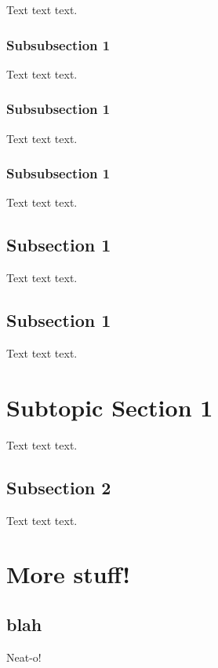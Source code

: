 \documentclass[twoside, titlepage]{amsart}
\theoremstyle{plain} %
\theoremstyle{definition}
\theoremstyle{remark}
\theoremstyle{notation}
\begin{document}
	Text text text.
	
	\subsubsection{Subsubsection 1}
	
	Text text text.
	
	\subsubsection{Subsubsection 1}
	
	Text text text.
	
	\subsubsection{Subsubsection 1}
	
	Text text text.
	
	\subsection{Subsection 1}
	
	Text text text.
	
	\subsection{Subsection 1}
	
	Text text text.
	
	\section{Subtopic Section 1}
	
	Text text text.
	
	\subsection{Subsection 2}
	
	Text text text.
	
	\clearpage 
	
	\section{More stuff!}
	
	\subsection{blah}
	
	Neat-o!
	
\end{document}
